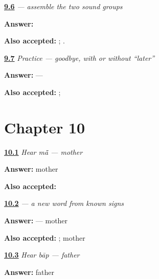 \noindent\begin{minipage}[t]{\linewidth}
\raggedright
\hyperlink{review-MW-C07-read-later-build}{\textbf{9.6}} \emph{  — assemble the two sound groups}\par
\small \textbf{Answer:}  \par
\footnotesize \textbf{Also accepted:}  ;  .
\end{minipage}\par\medskip

\noindent\begin{minipage}[t]{\linewidth}
\raggedright
\hyperlink{review-MW-C07-practice-later}{\textbf{9.7}} \emph{Practice — goodbye, with or without “later”}\par
\small \textbf{Answer:}   —   \par
\footnotesize \textbf{Also accepted:}  ;  
\end{minipage}\par\medskip

\section*{Chapter 10}

\noindent\begin{minipage}[t]{\linewidth}
\raggedright
\hyperlink{review-MW-C08-hear-maa-meaning}{\textbf{10.1}} \emph{Hear \emph{mā̃} — mother}\par
\small \textbf{Answer:} mother\par
\footnotesize \textbf{Also accepted:} 
\end{minipage}\par\medskip

\noindent\begin{minipage}[t]{\linewidth}
\raggedright
\hyperlink{review-MW-C08-maa-dictation}{\textbf{10.2}} \emph{ — a new word from known signs}\par
\small \textbf{Answer:}  — mother\par
\footnotesize \textbf{Also accepted:} ;  mother
\end{minipage}\par\medskip

\noindent\begin{minipage}[t]{\linewidth}
\raggedright
\hyperlink{review-MW-C08-hear-baap-meaning}{\textbf{10.3}} \emph{Hear \emph{bāp} — father}\par
\small \textbf{Answer:} father\par
\end{minipage}\par\medskip

